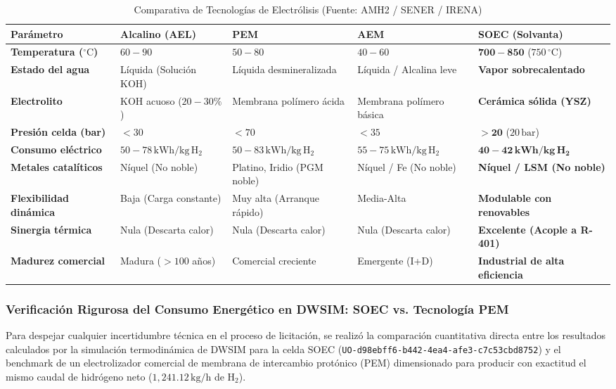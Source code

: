 \documentclass[11pt,a4paper]{article}
\begin{document}
\begin{table}[H]
\centering
\small
\caption{Comparativa de Tecnologías de Electrólisis (Fuente: AMH2 / SENER / IRENA)}
\label{tab:electrolizadores_benchmark}
\begin{tabular}{p{3.2cm} p{2.8cm} p{2.8cm} p{2.8cm} p{2.8cm}}
\toprule
\textbf{Parámetro} & \textbf{Alcalino (AEL)} & \textbf{PEM} & \textbf{AEM} & \textbf{SOEC (Solvanta)} \\
\midrule
\textbf{Temperatura ($^\circ\text{C}$)} & $60 - 90$ & $50 - 80$ & $40 - 60$ & $\mathbf{700 - 850}$ ($750\,^\circ\text{C}$) \\
\textbf{Estado del agua} & Líquida (Solución KOH) & Líquida desmineralizada & Líquida / Alcalina leve & \textbf{Vapor sobrecalentado} \\
\textbf{Electrolito} & KOH acuoso ($20-30\%$) & Membrana polímero ácida & Membrana polímero básica & \textbf{Cerámica sólida (YSZ)} \\
\textbf{Presión celda (bar)} & $< 30$ & $< 70$ & $< 35$ & $\mathbf{> 20}$ ($20\,\text{bar}$) \\
\textbf{Consumo eléctrico} & $50 - 78\,\text{kWh/kg}\,\text{H}_2$ & $50 - 83\,\text{kWh/kg}\,\text{H}_2$ & $55 - 75\,\text{kWh/kg}\,\text{H}_2$ & $\mathbf{40 - 42\,\text{kWh/kg}\,\text{H}_2}$ \\
\textbf{Metales catalíticos} & Níquel (No noble) & Platino, Iridio (PGM noble) & Níquel / Fe (No noble) & \textbf{Níquel / LSM (No noble)} \\
\textbf{Flexibilidad dinámica} & Baja (Carga constante) & Muy alta (Arranque rápido) & Media-Alta & \textbf{Modulable con renovables} \\
\textbf{Sinergia térmica} & Nula (Descarta calor) & Nula (Descarta calor) & Nula (Descarta calor) & \textbf{Excelente (Acople a R-401)} \\
\textbf{Madurez comercial} & Madura ($>100$ años) & Comercial creciente & Emergente (I+D) & \textbf{Industrial de alta eficiencia} \\
\bottomrule
\end{tabular}
\end{table}

\subsubsection{Verificación Rigurosa del Consumo Energético en DWSIM: SOEC vs. Tecnología PEM}
Para despejar cualquier incertidumbre técnica en el proceso de licitación, se realizó la comparación cuantitativa directa entre los resultados calculados por la simulación termodinámica de DWSIM para la celda SOEC (\texttt{UO-d98ebff6-b442-4ea4-afe3-c7c53cbd8752}) y el benchmark de un electrolizador comercial de membrana de intercambio protónico (PEM) dimensionado para producir con exactitud el mismo caudal de hidrógeno neto ($1{,}241.12\,\text{kg/h}$ de $\text{H}_2$).
\end{document}
